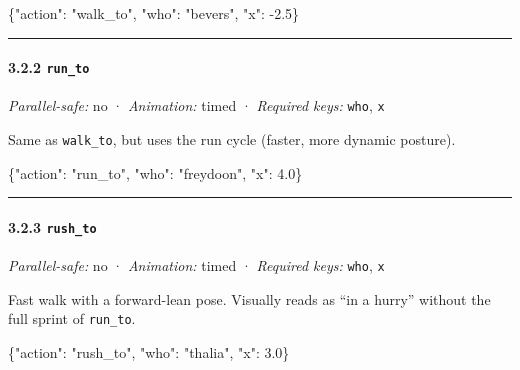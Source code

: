 \documentclass[
  12pt,
  letterpaper,
]{book}
\newenvironment{Shaded}{}{}
\newcommand{\DataTypeTok}[1]{\textcolor[rgb]{0.56,0.13,0.00}{#1}}
\newcommand{\FloatTok}[1]{\textcolor[rgb]{0.25,0.63,0.44}{#1}}
\newcommand{\FunctionTok}[1]{\textcolor[rgb]{0.02,0.16,0.49}{#1}}
\newcommand{\StringTok}[1]{\textcolor[rgb]{0.25,0.44,0.63}{#1}}
\begin{document}
\begin{Shaded}
\begin{Highlighting}[]
\FunctionTok{\{}\DataTypeTok{"action"}\FunctionTok{:} \StringTok{"walk\_to"}\FunctionTok{,} \DataTypeTok{"who"}\FunctionTok{:} \StringTok{"bevers"}\FunctionTok{,} \DataTypeTok{"x"}\FunctionTok{:} \FloatTok{{-}2.5}\FunctionTok{\}}
\end{Highlighting}
\end{Shaded}

\begin{center}\rule{0.5\linewidth}{0.5pt}\end{center}

\paragraph{\texorpdfstring{3.2.2
\texttt{run\_to}}{3.2.2 run\_to}}\label{run_to}

\emph{Parallel-safe:} no · \emph{Animation:} timed · \emph{Required
keys:} \texttt{who}, \texttt{x}

Same as \texttt{walk\_to}, but uses the run cycle (faster, more dynamic
posture).

\begin{Shaded}
\begin{Highlighting}[]
\FunctionTok{\{}\DataTypeTok{"action"}\FunctionTok{:} \StringTok{"run\_to"}\FunctionTok{,} \DataTypeTok{"who"}\FunctionTok{:} \StringTok{"freydoon"}\FunctionTok{,} \DataTypeTok{"x"}\FunctionTok{:} \FloatTok{4.0}\FunctionTok{\}}
\end{Highlighting}
\end{Shaded}

\begin{center}\rule{0.5\linewidth}{0.5pt}\end{center}

\paragraph{\texorpdfstring{3.2.3
\texttt{rush\_to}}{3.2.3 rush\_to}}\label{rush_to}

\emph{Parallel-safe:} no · \emph{Animation:} timed · \emph{Required
keys:} \texttt{who}, \texttt{x}

Fast walk with a forward-lean pose. Visually reads as ``in a hurry''
without the full sprint of \texttt{run\_to}.

\begin{Shaded}
\begin{Highlighting}[]
\FunctionTok{\{}\DataTypeTok{"action"}\FunctionTok{:} \StringTok{"rush\_to"}\FunctionTok{,} \DataTypeTok{"who"}\FunctionTok{:} \StringTok{"thalia"}\FunctionTok{,} \DataTypeTok{"x"}\FunctionTok{:} \FloatTok{3.0}\FunctionTok{\}}
\end{Highlighting}
\end{Shaded}
\end{document}
